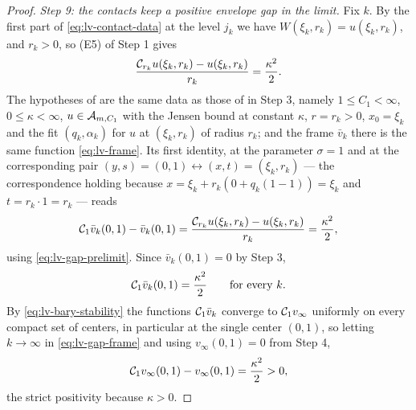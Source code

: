 \begin{proof}
\emph{Step 9: the contacts keep a positive envelope gap in the limit.}
Fix $k$. By the first part of \eqref{eq:lv-contact-data} at the level $j_k$ we
have $W(\xi_k,r_k)=u(\xi_k,r_k)$, and $r_k>0$, so (E5) of Step 1 gives
\begin{equation}\label{eq:lv-gap-prelimit}
  \frac{\mathcal{C}_{r_k}u(\xi_k,r_k)-u(\xi_k,r_k)}{r_k}=\frac{\kappa^2}{2}.
\end{equation}
The hypotheses of  are the same data as those of
 in Step 3, namely $1\le C_1<\infty$,
$0\le\kappa<\infty$, $u\in\mathcal{A}_{m,C_1}$ with the Jensen bound at constant
$\kappa$, $r=r_k>0$, $x_0=\xi_k$ and the fit $(q_k,\alpha_k)$ for $u$ at
$(\xi_k,r_k)$ of radius $r_k$; and the frame $\bar v_k$ there is the same
function \eqref{eq:lv-frame}. Its first identity, at the parameter $\sigma=1$
and at the corresponding pair $(y,s)=(0,1)\leftrightarrow(x,t)=(\xi_k,r_k)$ —
the correspondence holding because $x=\xi_k+r_k(0+q_k(1-1))=\xi_k$ and
$t=r_k\cdot1=r_k$ — reads
\[
  \mathcal{C}_1\bar v_k(0,1)-\bar v_k(0,1)
   =\frac{\mathcal{C}_{r_k}u(\xi_k,r_k)-u(\xi_k,r_k)}{r_k}=\frac{\kappa^2}{2},
\]
using \eqref{eq:lv-gap-prelimit}. Since $\bar v_k(0,1)=0$ by Step 3,
\begin{equation}\label{eq:lv-gap-frame}
  \mathcal{C}_1\bar v_k(0,1)=\frac{\kappa^2}{2}\qquad\text{for every }k .
\end{equation}
By \eqref{eq:lv-bary-stability} the functions $\mathcal{C}_1\bar v_k$ converge to
$\mathcal{C}_1v_\infty$ uniformly on every compact set of centers, in particular at
the single center $(0,1)$, so letting $k\to\infty$ in
\eqref{eq:lv-gap-frame} and using $v_\infty(0,1)=0$ from Step 4,
\begin{equation}\label{eq:lv-gap-limit}
  \mathcal{C}_1v_\infty(0,1)-v_\infty(0,1)=\frac{\kappa^2}{2}>0 ,
\end{equation}
the strict positivity because $\kappa>0$.


\end{proof}
